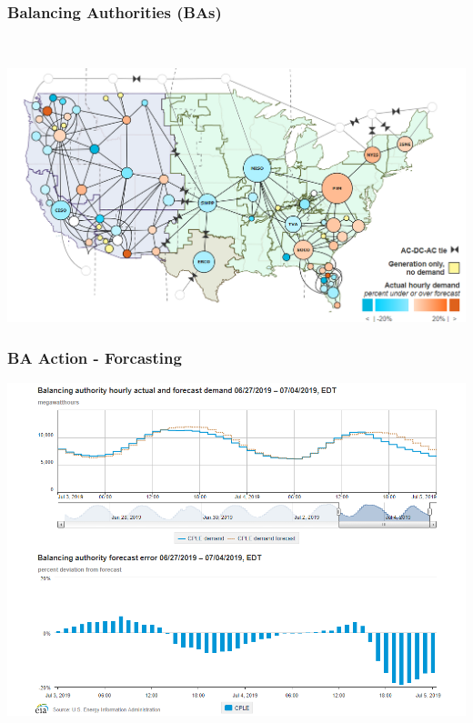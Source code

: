 \documentclass[14pt, unknownkeysallowed]{beamer}
\begin{document}
\begin{frame}
\frametitle{Balancing Authorities (BAs)}\ \vspace{.5em}
\begin{center}
\vspace{-1.5em}
\href{https://www.eia.gov/realtime_grid/}%
{\includegraphics[width=.95\linewidth]{BAs}} %
\end{center}
\vspace{-1em}
{\tiny \cite{BAinformation} }
\end{frame}
\begin{frame}
\frametitle{BA Action - Forcasting} %
\begin{center}
\includegraphics[height=.82\textheight]{BAforcast} {\tiny \cite{BAinformation} }%
\end{center}

\end{frame}
\end{document}
